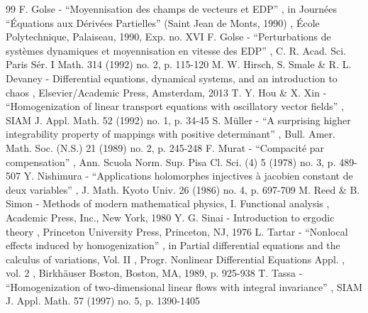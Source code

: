 \documentclass[11pt]{article}
\numberwithin{equation}{section}
\begin{document}
\begin{thebibliography}{99}
 F. Golse - “Moyennisation des champs de vecteurs et EDP” , in Journées “Équations aux Dérivées Partielles” (Saint Jean de Monts, 1990) , École Polytechnique, Palaiseau, 1990, Exp. no. XVI
 F. Golse - “Perturbations de systèmes dynamiques et moyennisation en vitesse des EDP” , C. R. Acad. Sci. Paris Sér. I Math. 314 (1992) no. 2, p. 115-120
 M. W. Hirsch, S. Smale \& R. L. Devaney - Differential equations, dynamical systems, and an introduction to chaos , Elsevier/Academic Press, Amsterdam, 2013
 T. Y. Hou \& X. Xin - “Homogenization of linear transport equations with oscillatory vector fields” , SIAM J. Appl. Math. 52 (1992) no. 1, p. 34-45
 S. Müller - “A surprising higher integrability property of mappings with positive determinant” , Bull. Amer. Math. Soc. (N.S.) 21 (1989) no. 2, p. 245-248
 F. Murat - “Compacité par compensation” , Ann. Scuola Norm. Sup. Pisa Cl. Sci. (4) 5 (1978) no. 3, p. 489-507
 Y. Nishimura - “Applications holomorphes injectives à jacobien constant de deux variables” , J. Math. Kyoto Univ. 26 (1986) no. 4, p. 697-709
 M. Reed \& B. Simon - Methods of modern mathematical physics, I. Functional analysis , Academic Press, Inc., New York, 1980
 Y. G. Sinai - Introduction to ergodic theory , Princeton University Press, Princeton, NJ, 1976
 L. Tartar - “Nonlocal effects induced by homogenization” , in Partial differential equations and the calculus of variations, Vol. II , Progr. Nonlinear Differential Equations Appl. , vol. 2 , Birkhäuser Boston, Boston, MA, 1989, p. 925-938
 T. Tassa - “Homogenization of two-dimensional linear flows with integral invariance” , SIAM J. Appl. Math. 57 (1997) no. 5, p. 1390-1405
\end{thebibliography}
\end{document}
